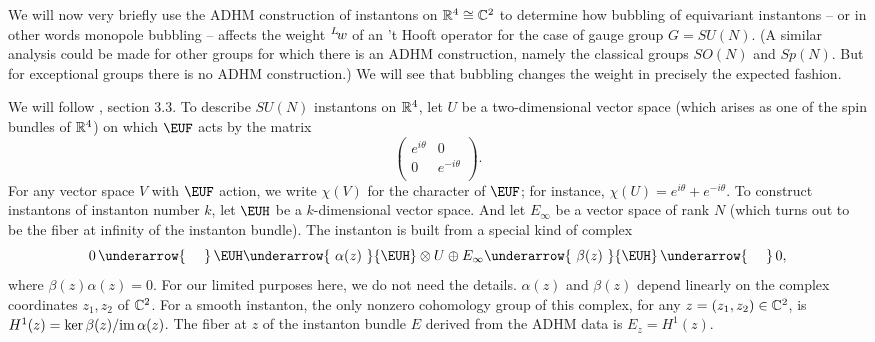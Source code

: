  We will now very briefly use the ADHM construction \cite{ref125} of instantons on $\Bbb{R}^4\cong \Bbb{C}^2$ to determine
how bubbling of equivariant instantons -- or in other words
monopole bubbling -- affects the weight $^L\negthinspace w$ of an
't Hooft operator for the case of gauge group $G=SU(N)$. (A
similar analysis could be made for other groups for which there is
an ADHM construction, namely the classical groups $SO(N)$ and
$Sp(N)$. But for exceptional groups there is no ADHM
construction.) We will see that bubbling changes the weight in
precisely the expected fashion.

We will follow \cite{ref126}, section 3.3. To describe $SU(N)$ instantons on
$\Bbb{R}^4$, let $U$ be a two-dimensional vector space (which
arises as one of the spin bundles of $\Bbb{R}^4$) on which
${\EUF}$ acts by the matrix %
\setcounter{equation}{5}
\begin{equation}\label{eq:normalo}
\left(\begin{matrix}e^{i\theta}
& 0 \\ 0 & e^{-i\theta}\\\end{matrix}\right).
\end{equation}
  For any vector space $V$
with ${\EUF}$ action, we write $\chi(V)$ for the character of
${\EUF}$; for instance,
 $\chi(U)=e^{i\theta}+e^{-i\theta}$. To construct instantons of
instanton number $k$, let ${{\EUH}}$ be a $k$-dimensional vector
space.  And let $E_\infty$ be a vector space of rank $N$ (which
turns out to be the fiber at infinity of the instanton bundle).
The instanton is built from a special kind of complex
\setcounter{equation}{6}
\begin{equation}\label{eq:onnos}
0\,\underarrow{~~~~}\,{{\EUH}}\underarrow{\,\,\alpha(z)\,\,}{{\EUH}}\otimes
U\oplus E_\infty\underarrow{\,\,\beta(z)\,\,}
{{\EUH}}\,\underarrow{~~~~}\, 0,
\end{equation}
 where $\beta(z)\alpha(z)=0$. For
our limited purposes here, we do not need the details. $\alpha(z)$
and $\beta(z)$ depend linearly on the complex coordinates
$z_1,z_2$ of $\Bbb{C}^2$.  For a smooth instanton, the only
nonzero cohomology group of this complex, for any $z=(z_1,z_2)\in
\Bbb{C}^2$, is $H^1(z)={\rm ker}\,\beta(z)/{\rm im}\,\alpha(z)$.
The fiber at $z$ of the instanton bundle $E$ derived from the ADHM
data is $E_z=H^1(z)$.

